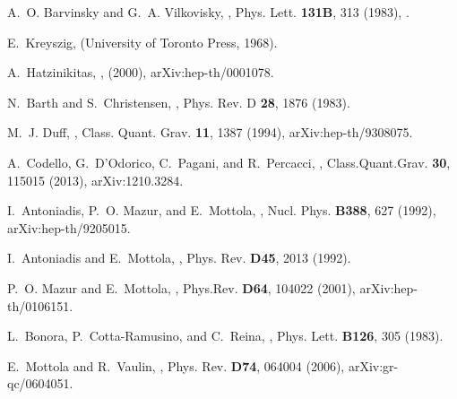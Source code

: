 \documentclass[a4paper,11pt,openright,twoside]{book}
\numberwithin{equation}{section}
\begin{document}
{{\begin{thebibliography}{100}
	A.~O. Barvinsky and G.~A. Vilkovisky,
	,
	\newblock Phys. Lett. {\bf 131B}, 313 (1983),
	\newblock [,141(1984)].
	
	E.~Kreyszig,
	(University of Toronto Press, 1968).
	
	A.~Hatzinikitas,
	,
	\newblock (2000), arXiv:hep-th/0001078.
	
	N.~Barth and S.~Christensen,
	,
	\newblock Phys. Rev. D {\bf 28}, 1876 (1983).
	
	M.~J. Duff,
	,
	\newblock Class. Quant. Grav. {\bf 11}, 1387 (1994), arXiv:hep-th/9308075.
	
	A.~Codello, G.~D'Odorico, C.~Pagani, and R.~Percacci,
	,
	\newblock Class.Quant.Grav. {\bf 30}, 115015 (2013), arXiv:1210.3284.
	
	I.~Antoniadis, P.~O. Mazur, and E.~Mottola,
	,
	\newblock Nucl. Phys. {\bf B388}, 627 (1992), arXiv:hep-th/9205015.
	
	I.~Antoniadis and E.~Mottola,
	,
	\newblock Phys. Rev. {\bf D45}, 2013 (1992).
	
	P.~O. Mazur and E.~Mottola,
	,
	\newblock Phys.Rev. {\bf D64}, 104022 (2001), arXiv:hep-th/0106151.
	
	L.~Bonora, P.~Cotta-Ramusino, and C.~Reina,
	,
	\newblock Phys. Lett. {\bf B126}, 305 (1983).
	
	E.~Mottola and R.~Vaulin,
	,
	\newblock Phys. Rev. {\bf D74}, 064004 (2006), arXiv:gr-qc/0604051.
	

\end{thebibliography}}}
\end{document}
